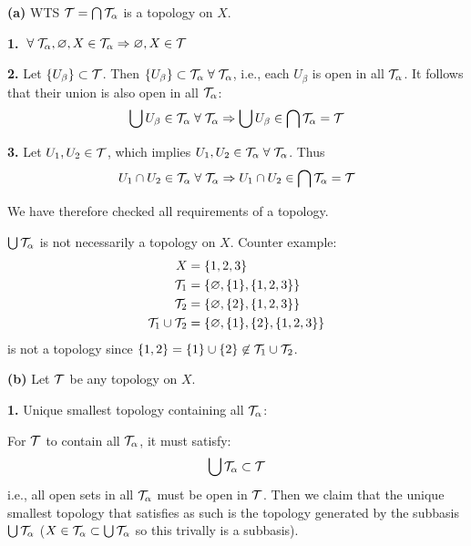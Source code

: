 \documentclass[a4paper, 12pt]{article}
\begin{document}
\begin{solution}
    \textbf{(a)} WTS $\mathcal{T} = \bigcap \mathcal{T}_\alpha$ is a topology on $X$.

    \textbf{1.} $\forall \calt_\alpha , \emptyset, X \in \calt_\alpha \implies \emptyset, X  \in \calt$

    \textbf{2.} Let $\{U_\beta\} \subset \mathcal{T}$. Then $\{U_\beta\} \subset \calt_\alpha \forall \calt_\alpha$, i.e., each $U_\beta$ is open in all $\mathcal{T}_\alpha$. It follows that their union is also open in all $\mathcal{T}_\alpha$:
    \begin{equation*}
    \bigcup U_\beta \in \calt_\alpha \forall \calt_\alpha \implies \bigcup U_\beta \in \bigcap \calt_\alpha = \calt
    \end{equation*}

    \textbf{3.} Let $U_1, U_2 \in \mathcal{T}$, which implies $U_1, U_2 \in \calt_\alpha \forall \calt_\alpha$. Thus \begin{equation*}
    U_1 \cap U_2 \in \calt_\alpha \forall \calt_\alpha \implies U_1 \cap U_2 \in \bigcap \calt_\alpha = \calt
    \end{equation*}

    We have therefore checked all requirements of a topology.

    $\bigcup \mathcal{T}_\alpha$ is not necessarily a topology on $X$. Counter example: 
    \begin{align*}
        X &= \{1, 2, 3\} \\
        \mathcal{T}_1 &= \{\varnothing, \{1\},  \{1, 2, 3\}\} \\
        \mathcal{T}_2 &= \{\varnothing, \{2\}, \{1, 2, 3\}\} \\
        \mathcal{T}_1 \cup \mathcal{T}_2 &= \{\varnothing, \{1\}, \{2\}, \{1, 2, 3\}\}
    \end{align*}
    is not a topology since $\{1, 2\} = \{1\} \cup \{2\} \not \in \mathcal{T}_1 \cup \mathcal{T}_2$.
    
    \textbf{(b)} Let $\mathcal{T}$ be any topology on $X$.

    \textbf{1.} Unique smallest topology containing all $\mathcal{T}_\alpha$:

    For $\mathcal{T}$ to contain all $\mathcal{T}_\alpha$, it must satisfy: \begin{equation*}
    \bigcup \mathcal{T}_\alpha \subset \mathcal{T}
    \end{equation*}
    i.e., all open sets in all $\mathcal{T}_\alpha$ must be open in $\mathcal{T}$. Then we claim that the unique smallest topology that satisfies as such is the topology generated by the subbasis $\bigcup \mathcal{T}_\alpha$ ($X \in \mathcal{T}_\alpha \subset \bigcup \mathcal{T}_\alpha$ so this trivally is a subbasis).


\end{solution}
\end{document}
